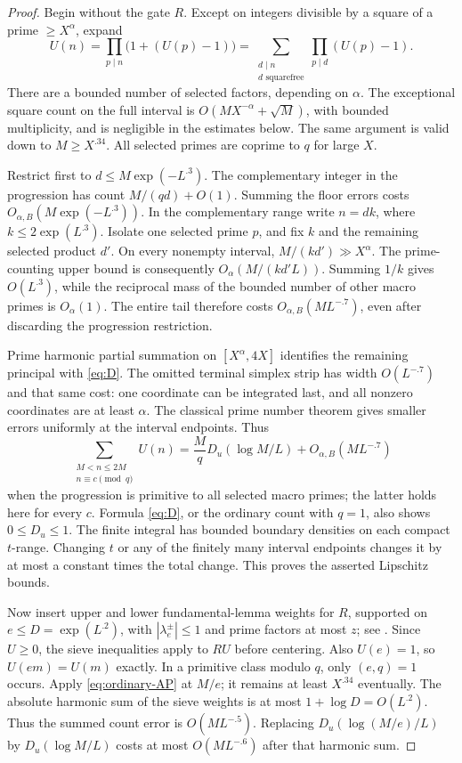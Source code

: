 \documentclass[11pt]{article}
\theoremstyle{remark}\newtheorem{remark}[theorem]{Remark}
\begin{document}
\begin{proof}
Begin without the gate $R$. Except on integers divisible by a square
of a prime $\ge X^\alpha$, expand
\[
 U(n)=\prod_{p\mid n}\bigl(1+(U(p)-1)\bigr)
       =\sum_{\substack{d\mid n\\d\text{ squarefree}}}
                  \prod_{p\mid d}(U(p)-1).
\]
There are a bounded number of selected factors, depending on $\alpha$.
The exceptional square count on the full interval is
$O(MX^{-\alpha}+\sqrt M)$, with bounded multiplicity, and is negligible
in the estimates below. The same argument is valid down to $M\ge X^{.34}$.
All selected primes are coprime to $q$ for large $X$.

Restrict first to $d\le M\exp(-L^{.3})$. The complementary integer in
the progression has count $M/(qd)+O(1)$. Summing the floor errors costs
$O_{\alpha,B}(M\exp(-L^{.3}))$. In the complementary range write $n=dk$,
where $k\le2\exp(L^{.3})$. Isolate one selected prime $p$, and fix $k$
and the remaining selected product $d'$. On every nonempty interval,
$M/(kd')\gg X^\alpha$. The prime-counting upper bound is consequently
$O_\alpha(M/(kd'L))$. Summing $1/k$ gives $O(L^{.3})$, while the
reciprocal mass of the bounded number of other macro primes is
$O_\alpha(1)$. The entire tail therefore costs $O_{\alpha,B}(ML^{-.7})$,
even after discarding the progression restriction.

Prime harmonic partial summation on $[X^\alpha,4X]$ identifies the
remaining principal with \eqref{eq:D}. The omitted terminal simplex
strip has width $O(L^{-.7})$ and that same cost: one coordinate can
be integrated last, and all nonzero coordinates are at least $\alpha$.
The classical prime number theorem gives smaller errors uniformly at
the interval endpoints. Thus
\begin{equation}\label{eq:ordinary-AP}
 \sum_{\substack{M<n\le2M\\n\equiv c\pmod q}}U(n)
       =\frac MqD_u(\log M/L)+O_{\alpha,B}(ML^{-.7})
\end{equation}
when the progression is primitive to all selected macro primes; the
latter holds here for every $c$. Formula \eqref{eq:D}, or the ordinary
count with $q=1$, also shows $0\le D_u\le1$.
The finite integral has bounded boundary densities on each compact
$t$-range. Changing $t$ or any of the finitely many interval endpoints
changes it by at most a constant times the total change. This proves
the asserted Lipschitz bounds.

Now insert upper and lower fundamental-lemma weights for $R$, supported
on $e\le D=\exp(L^{.2})$, with $|\lambda_e^\pm|\le1$ and prime
factors at most $z$; see \cite[Theorem 19.1]{kouk}.
Since $U\ge0$, the sieve inequalities apply to $RU$ before centering.
Also $U(e)=1$, so $U(em)=U(m)$ exactly. In a primitive class modulo $q$,
only $(e,q)=1$ occurs. Apply \eqref{eq:ordinary-AP} at $M/e$; it remains
at least $X^{.34}$ eventually. The absolute harmonic sum of the sieve
weights is at most $1+\log D=O(L^{.2})$. Thus the summed count error
is $O(ML^{-.5})$. Replacing
$D_u(\log(M/e)/L)$ by $D_u(\log M/L)$ costs at most
$O(ML^{-.6})$ after that harmonic sum.


\end{proof}
\end{document}
